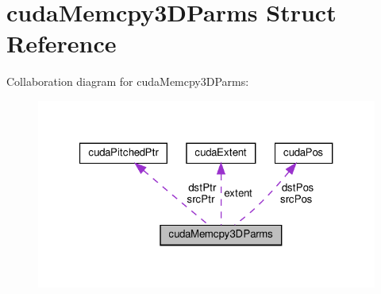 \hypertarget{structcudaMemcpy3DParms}{}\section{cuda\+Memcpy3\+D\+Parms Struct Reference}
\label{structcudaMemcpy3DParms}


Collaboration diagram for cuda\+Memcpy3\+D\+Parms\+:\nopagebreak
\begin{figure}[H]
\begin{center}
\leavevmode
\includegraphics[width=321pt]{structcudaMemcpy3DParms__coll__graph}
\end{center}
\end{figure}
